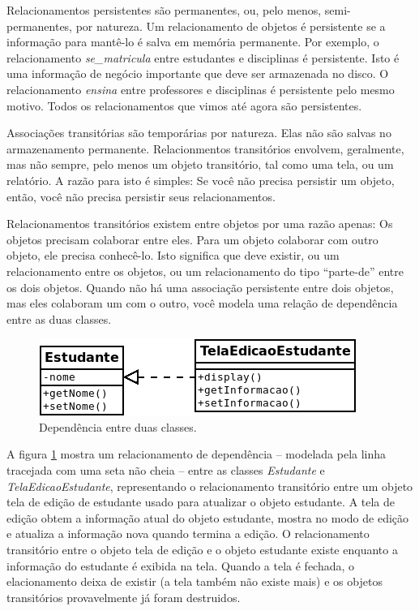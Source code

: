 \documentclass[
	article,			%
	12pt,				%
	openright,
	twoside,			%
	a4paper,			%
	english,			%
	french,
	brazil,				%
	sumario=tradicional
	]{abntex2}
\begin{document}
Relacionamentos persistentes são permanentes, ou, pelo menos, semi-permanentes, por natureza. Um relacionamento de objetos é persistente se a informação para mantê-lo é salva em memória permanente. Por exemplo, o relacionamento \emph{se\_matricula} entre estudantes e disciplinas é persistente. Isto é uma informação de negócio importante que deve ser armazenada no disco. O relacionamento \emph{ensina} entre professores e disciplinas é persistente pelo mesmo motivo. Todos os relacionamentos que vimos até agora são persistentes.

Associações transitórias são temporárias por natureza. Elas não são salvas no armazenamento permanente. Relacionmentos transitórios envolvem, geralmente, mas não sempre, pelo menos um objeto transitório, tal como uma tela, ou um relatório. A razão para isto é simples: Se você não precisa persistir um objeto, então, você não precisa persistir seus relacionamentos.

Relacionamentos transitórios existem entre objetos por uma razão apenas: Os objetos precisam colaborar entre eles. Para um objeto colaborar com outro objeto, ele precisa conhecê-lo. Isto significa que deve existir, ou um relacionamento entre os objetos, ou um relacionamento do tipo ``parte-de'' entre os dois objetos. Quando não há uma associação persistente  entre dois objetos, mas eles colaboram um com o outro, você modela uma relação de dependência entre as duas classes.

\begin{figure}
\begin{center}
\includegraphics[scale=0.7]{classDep.png}
\end{center}
\caption{Dependência entre duas classes.} \label{fig:clsDep}
\end{figure}

A figura \ref{fig:clsDep} mostra um relacionamento de dependência -- modelada pela linha tracejada com uma seta não cheia -- entre as classes \emph{Estudante} e \emph{TelaEdicaoEstudante}, representando o relacionamento transitório entre um objeto tela de edição de estudante usado para atualizar o objeto estudante. A tela de edição obtem a informação atual do objeto estudante, mostra no modo de edição e atualiza a informação nova quando termina a edição. O relacionamento transitório entre o objeto tela de edição e o objeto estudante existe enquanto a informação do estudante é exibida na tela. Quando a tela é fechada, o elacionamento deixa de existir (a tela também não existe mais) e os objetos transitórios provavelmente já foram destruidos.
\end{document}
